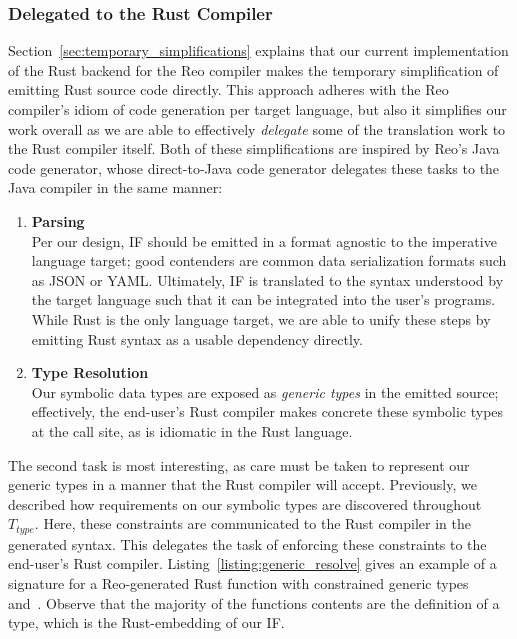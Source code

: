 \subsubsection{Delegated to the Rust Compiler}
Section~\ref{sec:temporary_simplifications} explains that our current implementation of the Rust backend for the Reo compiler makes the temporary simplification of emitting Rust source code directly. This approach adheres with the Reo compiler's idiom of code generation per target language, but also it simplifies our work overall as we are able to effectively \textit{delegate} some of the translation work to the Rust compiler itself. Both of these simplifications are inspired by Reo's Java code generator, whose direct-to-Java code generator delegates these tasks to the Java compiler in the same manner:
\begin{enumerate}
	\item \textbf{Parsing}\\
	Per our design, IF should be emitted in a format agnostic to the imperative language target; good contenders are common data serialization formats such as JSON or YAML. Ultimately, IF is translated to the syntax understood by the target language such that it can be integrated into the user's programs. While Rust is the only language target, we are able to unify these steps by emitting Rust syntax as a usable dependency directly.
	
	\item \textbf{Type Resolution}\\
	Our symbolic data types are exposed as \textit{generic types} in the emitted source; effectively, the end-user's Rust compiler makes concrete these symbolic types at the call site, as is idiomatic in the Rust language.
\end{enumerate}

The second task is most interesting, as care must be taken to represent our generic types in a manner that the Rust compiler will accept. Previously, we described how requirements on our symbolic types are discovered throughout $T_{type}$. Here, these constraints are communicated to the Rust compiler in the generated syntax. This delegates the task of enforcing these constraints to the end-user's Rust compiler. Listing~\ref{listing:generic_resolve} gives an example of a signature for a Reo-generated Rust function with constrained generic types~ and~. Observe that the majority of the functions contents are the definition of a~ type, which is the Rust-embedding of our IF. 

